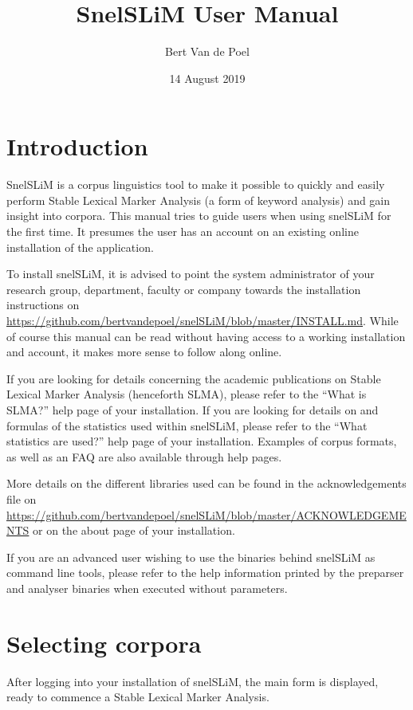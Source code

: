\documentclass[11pt,a4paper]{article}
\title{SnelSLiM User Manual}
\author{Bert Van de Poel}
\date{14 August 2019}
\begin{document}
\maketitle

\tableofcontents

\newpage

\section{Introduction}

SnelSLiM is a corpus linguistics tool to make it possible to quickly and easily perform Stable Lexical Marker Analysis (a form of keyword analysis) and gain insight into corpora. This manual tries to guide users when using snelSLiM for the first time. It presumes the user has an account on an existing online installation of the application.

To install snelSLiM, it is advised to point the system administrator of your research group, department, faculty or company towards the installation instructions on \url{https://github.com/bertvandepoel/snelSLiM/blob/master/INSTALL.md}. While of course this manual can be read without having access to a working installation and account, it makes more sense to follow along online. 

If you are looking for details concerning the academic publications on Stable Lexical Marker Analysis (henceforth SLMA), please refer to the ``What is SLMA?'' help page of your installation. If you are looking for details on and formulas of the statistics used within snelSLiM, please refer to the ``What statistics are used?'' help page of your installation. Examples of corpus formats, as well as an FAQ are also available through help pages.

More details on the different libraries used can be found in the acknowledgements file on \url{https://github.com/bertvandepoel/snelSLiM/blob/master/ACKNOWLEDGEMENTS} or on the about page of your installation.

If you are an advanced user wishing to use the binaries behind snelSLiM as command line tools, please refer to the help information printed by the preparser and analyser binaries when executed without parameters.

\section{Selecting corpora}

After logging into your installation of snelSLiM, the main form is displayed, ready to commence a Stable Lexical Marker Analysis. 
\end{document}
